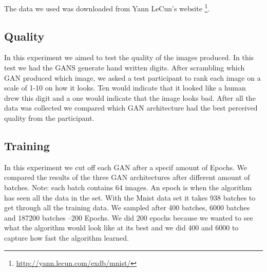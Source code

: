 \documentclass[12pt,
 reprint,
nofootinbib,
 amsmath,amssymb,
 aps,
floatfix,
]{revtex4-2}
\begin{document}
The data we used was downloaded from Yann LeCun's website \footnote{\url{http://yann.lecun.com/exdb/mnist/}}.


\subsection{\label{sec:expQuality}Quality}

In this experiment we aimed to test the quality of the images produced. In this test we had the GANS generate hand written digits. After scrambling which GAN produced which image, we asked a test participant to rank each image on a scale of 1-10 on how it looks. Ten would indicate that it looked like a human drew this digit and a one would indicate that the image looks bad. After all the data was collected we compared which GAN architecture had the best perceived quality from the participant. 




\subsection{\label{sec:expTime}Training}

In this experiment we cut off each GAN after a specif amount of Epochs. We compared the results of the three GAN architectures after different amount of batches. Note: each batch contains 64 images. An epoch is when the algorithm has seen all the data in the set. With the Mnist data set it takes 938 batches to get through all the training data. We sampled after 400 batches, 6000 batches and 
187200 batches --200 Epochs. We did 200 epochs because we wanted to see what the algorithm would look like at its best and we did 400 and 6000 to capture how fast the algorithm learned.
\end{document}
